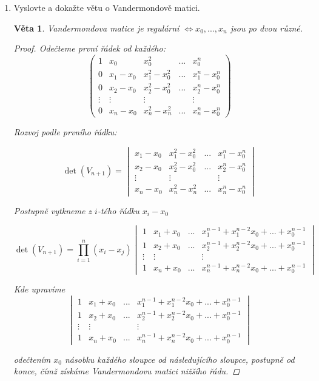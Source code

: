 \documentclass[10pt,a4paper]{article}
\theoremstyle{plain}
\newtheorem{veta}{Věta}
\begin{document}
\begin{enumerate}
\item Vyslovte a dokažte větu o Vandermondově matici.
\begin{veta}
Vandermondova matice je regulární $\iff x_0, ..., x_n$ jsou po dvou různé. 
\begin{proof}
Odečteme první řádek od každého:
\[ \begin{pmatrix}
1 & x_0 & x_0^2 & ... & x_0^n \\
0 & x_1 - x_0 & x_1^2 - x_0^2 & ... & x_1^n - x_0^n \\ 
0 & x_2 - x_0 & x_2^2 - x_0^2 & ... & x_2^n - x_0^n \\ 
\vdots & \vdots & \vdots & & \vdots \\
0 & x_n - x_0 & x_n^2 - x_n^2 & ... & x_n^n - x_0^n 
\end{pmatrix}\]

Rozvoj podle prvního řádku:

\[ \det(V_{n+1}) = \begin{vmatrix}
 x_1 - x_0 & x_1^2 - x_0^2 & ... & x_1^n - x_0^n \\ 
 x_2 - x_0 & x_2^2 - x_0^2 & ... & x_2^n - x_0^n \\ 
\vdots & \vdots &  & \vdots \\
 x_n - x_0 & x_n^2 - x_n^2 & ... & x_n^n - x_0^n 
\end{vmatrix}\]

Postupně vytkneme z $i$-tého řádku $x_i - x_0$

\[ \det(V_{n+1}) = \prod^n_{i=1} (x_i - x_j) \begin{vmatrix}
 1 & x_1 +  x_0  & ... &  x_1^{n-1} + x_1^{n-2}x_0 + ... + x_0^{n-1}  \\ 
 1 & x_2 + x_0 & ... &  x_2^{n-1} + x_2^{n-2}x_0 + ... + x_0^{n-1}  \\ 
\vdots & \vdots &  &\vdots \\
 1 & x_n + x_0 & ... & x_n^{n-1} + x_n^{n-2}x_0 + ... + x_0^{n-1} 
\end{vmatrix}\]

Kde upravíme \[  \begin{vmatrix}
 1 & x_1 +  x_0  & ... &  x_1^{n-1} + x_1^{n-2}x_0 + ... + x_0^{n-1}  \\ 
 1 & x_2 + x_0 & ... &  x_2^{n-1} + x_2^{n-2}x_0 + ... + x_0^{n-1}  \\ 
\vdots & \vdots &  &\vdots \\
 1 & x_n + x_0 & ... & x_n^{n-1} + x_n^{n-2}x_0 + ... + x_0^{n-1} 
\end{vmatrix} \]

odečtením $x_0$ násobku každého sloupce od následujícího sloupce, postupně od konce, čímž získáme Vandermondovu matici nižšího řádu.


\end{proof}
\end{veta}
\end{enumerate}
\end{document}
